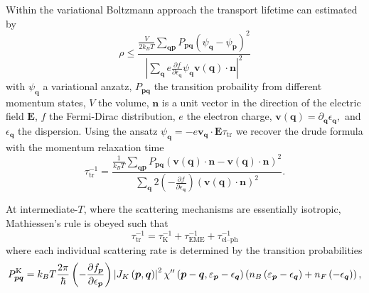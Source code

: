 \documentclass[aps,prl,twocolumn,superscriptaddress,amsmath,nofootinbib,10pt,floatfix]{revtex4-2}
\begin{document}
\begin{widetext}
Within the variational Boltzmann approach \cite{Ziman_2001} 
the transport
lifetime can estimated by 
\begin{equation}
\rho\leq\frac{\frac{V}{2k_BT}\sum_{\boldsymbol{q}\boldsymbol{p}}P_{\boldsymbol{p}\boldsymbol{q}}\left(\psi_{\boldsymbol{q}}-\psi_{\boldsymbol{p}}\right)^{2}}{\left|\sum_{\boldsymbol{q}}e\frac{\partial f}{\partial\epsilon_{\boldsymbol{q}}}\psi_{\boldsymbol{q}}\boldsymbol{v}\left(\boldsymbol{q}\right)\cdot\boldsymbol{n}\right|^{2}}
\end{equation}
with $\psi_{\boldsymbol{q}}$ a variational anzatz, $P_{\boldsymbol{p}\boldsymbol{q}}$
the transition probaility from different momentum states, $V$ the
volume, $\boldsymbol{n}$ is a unit vector in the direction of the electric field $\boldsymbol{E}$,
$f$ the Fermi-Dirac distribution, $e$ the electron charge, $\boldsymbol{v}\left(\boldsymbol{q}\right)=\partial_{\boldsymbol{q}}\epsilon_{\boldsymbol{q}},$
and $\epsilon_{\boldsymbol{q}}$ the dispersion. Using the ansatz
$\psi_{\boldsymbol{q}}=-e\boldsymbol{v}_{\boldsymbol{q}}\cdot\boldsymbol{E}\tau_{\text{tr}}$
we recover the drude formula with the momentum relaxation time
\begin{equation}
\tau_{\text{tr}}^{-1}=\frac{\frac{1}{k_BT}\sum_{\boldsymbol{q}\boldsymbol{p}}P_{\boldsymbol{p}\boldsymbol{q}}\left(\boldsymbol{v}\left(\boldsymbol{q}\right)\cdot\boldsymbol{n}-\boldsymbol{v}\left(\boldsymbol{q}\right)\cdot\boldsymbol{n}\right)^{2}}{\sum_{\boldsymbol{q}}2\left(-\frac{\partial f}{\partial\epsilon_{\boldsymbol{q}}}\right)\left(\boldsymbol{v}\left(\boldsymbol{q}\right)\cdot\boldsymbol{n}\right)^{2}}.
\label{tr_time_SI}   
\end{equation}

At intermediate-$T$, where the scattering mechanisms are essentially isotropic, Mathiessen's rule is obeyed such that 
\begin{equation}
\tau_{\text{tr}}^{-1}=\tau_{\text{K}}^{-1}+\tau_{\text{EME}}^{-1}+\tau_{\text{el--ph}}^{-1}
\end{equation}
where each individual scattering rate is determined by the transition
probabilities 
\begin{equation}
P_{\boldsymbol{p}\boldsymbol{q}}^{\rm{K}}=k_BT\frac{2\pi}{\hbar}\left(-\frac{\partial f_{\boldsymbol{p}}}{\partial\epsilon_{\boldsymbol{p}}}\right)\left|J_{K}\left(\boldsymbol{p},\boldsymbol{q}\right)\right|^{2}\chi''\left(\boldsymbol{p}-\boldsymbol{q},\varepsilon_{\boldsymbol{p}}-\epsilon_{\boldsymbol{q}}\right)\left(n_{B}\left(\varepsilon_{\boldsymbol{p}}-\epsilon_{\boldsymbol{q}}\right)+n_{F}\left(-\epsilon_{\boldsymbol{q}}\right)\right),
\end{equation}


\end{widetext}
\end{document}
